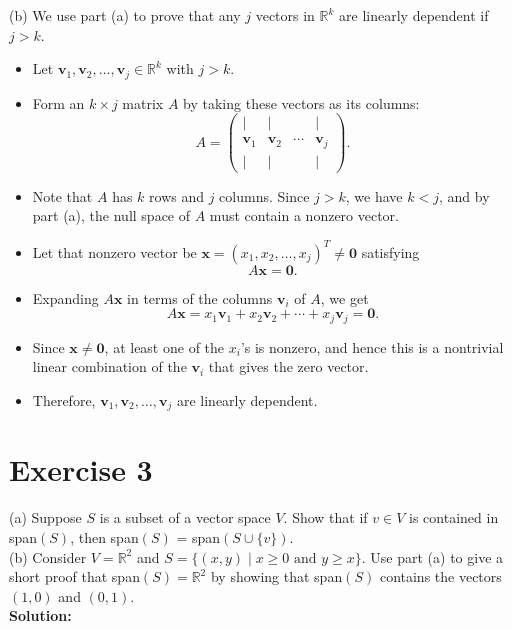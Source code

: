 \documentclass{article}
\begin{document}
(b) We use part (a) to prove that any $j$ vectors in $\mathbb{R}^k$ are linearly dependent if $j > k$.

\begin{itemize}
\item Let $\mathbf{v}_1,\mathbf{v}_2,\dots,\mathbf{v}_j \in \mathbb{R}^k$ with $j > k$. 
\item Form an $k \times j$ matrix $A$ by taking these vectors as its columns:
\[
A = 
\begin{pmatrix}
| & | &  & | \\
\mathbf{v}_1 & \mathbf{v}_2 & \cdots & \mathbf{v}_j \\
| & | &  & |
\end{pmatrix}.
\]
\item Note that $A$ has $k$ rows and $j$ columns. Since $j > k$, we have $k < j$, and by part (a), the null space of $A$ must contain a nonzero vector. 
\item Let that nonzero vector be $\mathbf{x} = (x_1, x_2, \dots, x_j)^T \neq \mathbf{0}$ satisfying
\[
A \mathbf{x} = \mathbf{0}.
\]
\item Expanding $A\mathbf{x}$ in terms of the columns $\mathbf{v}_i$ of $A$, we get
\[
A\mathbf{x} = x_1 \mathbf{v}_1 + x_2 \mathbf{v}_2 + \cdots + x_j \mathbf{v}_j = \mathbf{0}.
\]
\item Since $\mathbf{x} \neq \mathbf{0}$, at least one of the $x_i$'s is nonzero, and hence this is a nontrivial linear combination of the $\mathbf{v}_i$ that gives the zero vector.
\item Therefore, $\mathbf{v}_1,\mathbf{v}_2,\dots,\mathbf{v}_j$ are linearly dependent.
\end{itemize}

\newpage

\section*{Exercise 3}
(a) Suppose $S$ is a subset of a vector space $V$. Show that if $v \in V$ is contained in span$(S)$, then span$(S)$ = span$(S \cup \{v\})$. \\

\noindent
(b) Consider $V = \mathbb{R}^2$ and $S = \{(x,y) \mid x \geq 0 \text{ and } y \geq x\}$. Use part (a) to give a short proof that span$(S) = \mathbb{R}^2$ by showing that span$(S)$ contains the vectors $(1,0)$ and $(0,1)$. \\

\textbf{Solution:}
\newpage
\end{document}

